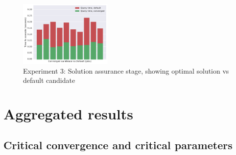 \documentclass[a4paper,english]{report}
\begin{document}
	\begin{figure}[H]
		\centering
		\includegraphics[width=130pt]{runlogs/final9/4}
		\caption{Experiment 3: Solution assurance stage, showing optimal solution vs default candidate}
		\label{fig:final34}
	\end{figure}
	\clearpage
	\section{Aggregated results}
	
	\subsection{Critical convergence and critical parameters}
\end{document}
